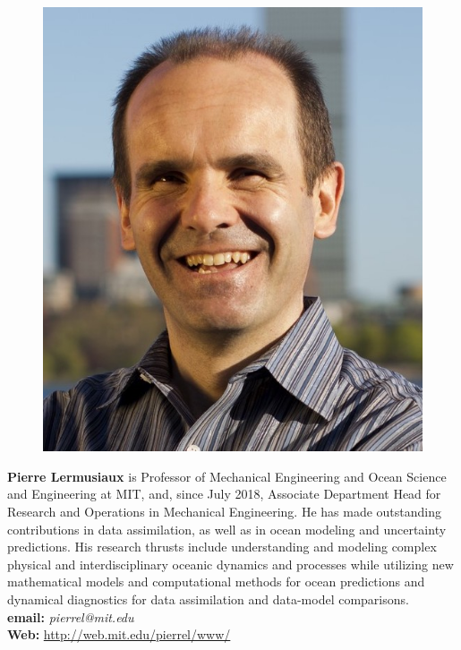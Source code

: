 \vspace*{3cm}
\parbox{6.5in}{
\begin{figure} %
  \vspace{-\intextsep}
    \hspace*{-.35\columnsep}\includegraphics[scale=0.3]{fig/Pierre.jpg}
\end{figure}
\textbf{Pierre Lermusiaux} is Professor of Mechanical Engineering and
Ocean Science and Engineering at MIT, and, since July 2018, Associate
Department Head for Research and Operations in Mechanical
Engineering. He has made outstanding contributions in data
assimilation, as well as in ocean modeling and uncertainty
predictions. His research thrusts include understanding and modeling
complex physical and interdisciplinary oceanic dynamics and processes
while utilizing new mathematical models and computational methods for
ocean predictions and dynamical diagnostics for data assimilation
and data-model comparisons.
\\
\textbf{email: }\emph{pierrel@mit.edu}\\
\textbf{Web: }\url{http://web.mit.edu/pierrel/www/} 
}

